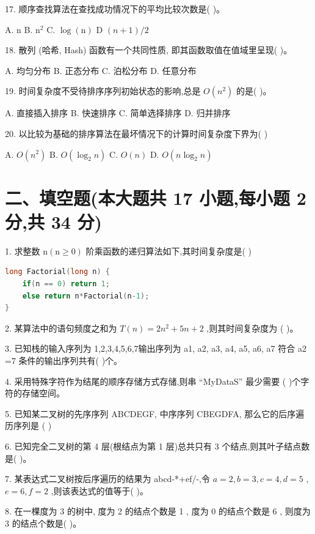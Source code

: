 17. 顺序查找算法在查找成功情况下的平均比较次数是(   )。

A. \({\mathrm{n}}\) B. \({\mathrm{n}}^{2}\) C. \(\log \left( \mathrm{n}\right)\) D \(\left( {n + 1}\right) /2\)

18. 散列 (哈希, Hash) 函数有一个共同性质, 即其函数取值在值域里呈现(   )。

A. 均匀分布 B. 正态分布 C. 泊松分布 D. 任意分布

19. 时间复杂度不受待排序序列初始状态的影响,总是 \(O\left( {n}^{2}\right)\) 的是(   )。

A. 直接插入排序 B. 快速排序 C. 简单选择排序 D. 归并排序


20. 以比较为基础的排序算法在最坏情况下的计算时间复杂度下界为(   )

A. \(O\left( {n}^{2}\right)\) B. \(O\left( {{\log }_{2}n}\right)\) C. \(O\left( n\right)\) D. \(O\left( {n{\log }_{2}n}\right)\)

\section*{二、填空题(本大题共 17 小题,每小题 2 分,共 34 分)}

1. 求整数 \(\mathrm{n}\left( {\mathrm{n} \geq  0}\right)\) 阶乘函数的递归算法如下,其时间复杂度是(   )

\begin{lstlisting}[language=C, basicstyle=\ttfamily]
long Factorial(long n) {
    if(n == 0) return 1;
    else return n*Factorial(n-1);
}
\end{lstlisting}

2. 某算法中的语句频度之和为 \(T\left( n\right)  = 2{n}^{2} + {5n} + 2\) ,则其时间复杂度为 (   )。

3. 已知栈的输入序列为 1,2,3,4,5,6,7输出序列为 a1, a2, a3, a4, a5, a6, a7 符合 a2 =7 条件的输出序列共有(   )个。

4. 采用特殊字符作为结尾的顺序存储方式存储,则串 “MyDataS” 最少需要 (   )个字符的存储空间。

5. 已知某二叉树的先序序列 ABCDEGF, 中序序列 CBEGDFA, 那么它的后序遍历序列是 (   )

6. 已知完全二叉树的第 4 层(根结点为第 1 层)总共只有 3 个结点,则其叶子结点数是(   )。

7. 某表达式二叉树按后序遍历的结果为 abcd-*+ef/-,令 \(a = 2,b = 3,c = 4,d = 5\) , \(e = 6,f = 2\) ,则该表达式的值等于(   )。

8. 在一棵度为 3 的树中, 度为 2 的结点个数是 1 , 度为 0 的结点个数是 6 , 则度为 3 的结点个数是(   )。

